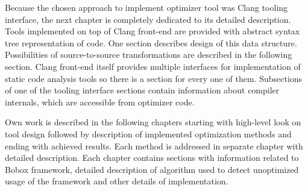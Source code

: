 Because the chosen approach to implement optimizer tool was Clang tooling interface, the next chapter is completely dedicated to its detailed description. Tools implemented on top of Clang front-end are provided with abstract syntax tree representation of code. One section describes design of this data structure. Possibilities of source-to-source transformations are described in the following section. Clang front-end itself provides multiple interfaces for implementation of static code analysis tools so there is a section for every one of them. Subsections of one of the tooling interface sections contain information about compiler internals, which are accessible from optimizer code.

Own work is described in the following chapters starting with high-level look on tool design followed by description of implemented optimization methods and ending with achieved results. Each method is addressed in separate chapter with detailed description. Each chapter contains sections with information related to Bobox framework, detailed description of algorithm used to detect unoptimized usage of the framework and other details of implementation.